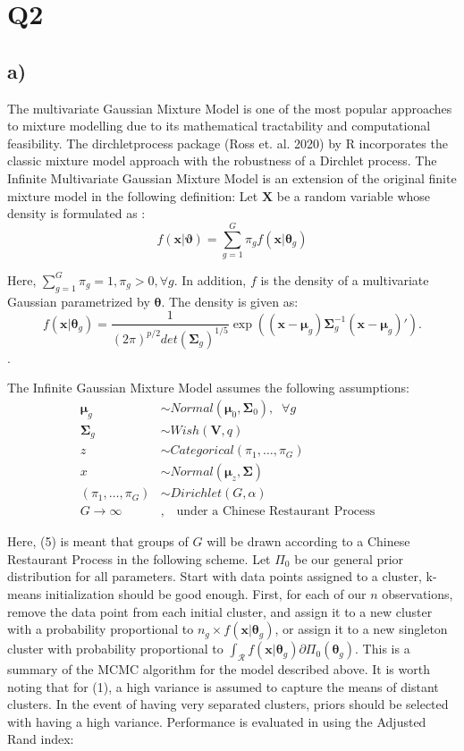 \documentclass[12pt, centerh1]{article}
\newcommand{\bmt}{\bm{\theta}}
\newcommand{\bmx}{\bm{x}}
\newcommand{\bmX}{\bm{X}}
\newcommand{\bmmu}{\bm{\mu}}
\newcommand{\bmSg}{\bm{\Sigma}}
\begin{document}
\section*{Q2}
\subsection*{a)}

The multivariate Gaussian Mixture Model is one of the most popular approaches to mixture modelling due to its  
mathematical tractability and computational feasibility. The dirchletprocess package (Ross et. al. 2020) by R incorporates the classic mixture model approach with the robustness of a Dirchlet process. The Infinite Multivariate Gaussian Mixture Model is an extension of the original finite mixture model in the following definition:
Let $\bmX$ be a random variable whose density is formulated as : 
$$f(\bmx|\bm{\vartheta}) = \sum_{g=1}^G \pi_g f(\bmx|\bm{\theta}_g) $$

Here, $ \sum_{g=1}^G \pi_g = 1 , \pi_g > 0, \forall g $. In addition, $f$ is the density of a multivariate Gaussian parametrized by $\bmt$. The density is given as:
$$ f(\bmx|\bm{\theta}_g) = \frac{1}{(2\pi)^{p/2} det(\bmSg_g)^{1/5}} \exp \left( (\bmx - \bmmu_g)\bmSg_g^{-1} (\bmx - \bmmu_g)' \right). $$. 

The Infinite Gaussian Mixture Model assumes the following assumptions:
\begin{align}
\bmmu_g &\sim Normal(\bmmu_0, \bmSg_0), \;\; \forall g \\
\bmSg_g & \sim Wish(\bm{V},q) & \\
z &\sim Categorical(\pi_1, \dots, \pi_G) \\
x &\sim Normal(\bmmu_z, \bmSg) \\
(\pi_1, \dots, \pi_G) &\sim Dirichlet(G, \alpha) \\
G  \to \infty &, \quad \text{under a Chinese Restaurant Process} 
\end{align}


Here, (5) is meant that groups of $G$ will be drawn according to a Chinese Restaurant Process in the following scheme. Let $\Pi_0$ be our general prior distribution for all parameters. Start with data points assigned to a cluster, k-means initialization should be good enough. First, for each of our $n$ observations, remove the data point from each initial cluster, and assign it to a new cluster with a probability proportional to $n_g \times f(\bmx|\bm{\theta}_g) $, or assign it to a new singleton cluster with probability proportional to $\int_{\mathcal{R}} f(\bmx|\bm{\theta}_g)\partial \Pi_0(\bm{\theta}_g)$.  This is a summary of the MCMC algorithm for the model described above. It is worth noting that for (1), a high variance is assumed to capture the means of distant clusters. In the event of having very separated clusters, priors should be selected with having a high variance. Performance is evaluated in using the Adjusted Rand index:
\end{document}
